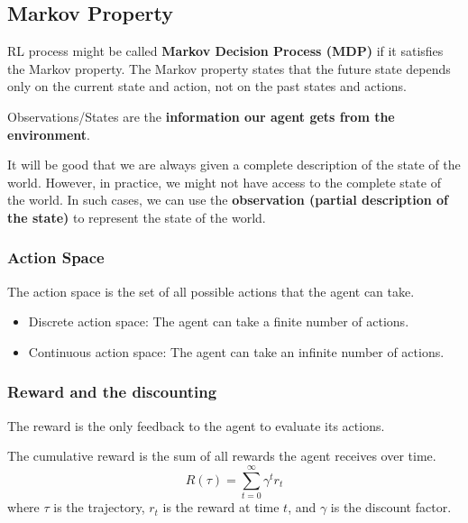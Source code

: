 \subsection{Markov Property}
RL process might be called \textbf{Markov Decision Process (MDP)} if it satisfies the Markov property. The Markov property states that the future state depends only on the current state and action, not on the past states and actions.

\begin{definition}
    Observations/States are the \textbf{information our agent gets from the environment}.
\end{definition}

It will be good that we are always given a complete description of the state of the world. However, in practice, we might not have access to the complete state of the world. In such cases, we can use the \textbf{observation (partial description of the state)} to represent the state of the world.

\subsubsection{Action Space}

\begin{definition}
    The action space is the set of all possible actions that the agent can take.
\end{definition}
\begin{itemize}
    \item Discrete action space: The agent can take a finite number of actions.
    \item Continuous action space: The agent can take an infinite number of actions.
\end{itemize}

\subsubsection{Reward and the discounting}

The reward is the only feedback to the agent to evaluate its actions. 

The cumulative reward is the sum of all rewards the agent receives over time. \begin{equation}
    R(\tau) = \sum_{t=0}^{\infty} \gamma^t r_t
\end{equation}
where $\tau$ is the trajectory, $r_t$ is the reward at time $t$, and $\gamma$ is the discount factor.

